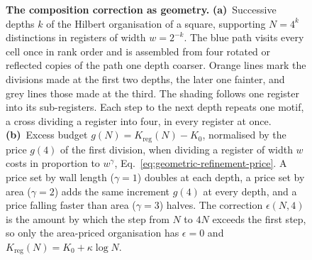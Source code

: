 \begin{figure}[t]
  \caption{\textbf{The composition correction as geometry.}
    \textbf{(a)}~Successive depths $k$ of the Hilbert organisation of a
    square, supporting $N=4^k$ distinctions in registers of width
    $w=2^{-k}$. The blue path visits every cell once in rank order and is
    assembled from four rotated or reflected copies of the path one depth
    coarser. Orange lines mark the divisions made at the first two depths,
    the later one fainter, and grey lines those made at the third. The
    shading follows one register into its sub-registers. Each step to the
    next depth repeats one motif, a cross dividing a register into four,
    in every register at once.
    \textbf{(b)}~Excess budget $g(N)=K_{\mathrm{reg}}(N)-K_0$, normalised
    by the price $g(4)$ of the first division, when dividing a register
    of width $w$ costs in proportion to $w^{\gamma}$,
    Eq.~\eqref{eq:geometric-refinement-price}. A price set by wall length
    ($\gamma=1$) doubles at each depth, a price set by area
    ($\gamma=2$) adds the same increment $g(4)$ at every depth, and a
    price falling faster than area ($\gamma=3$) halves. The correction
    $\epsilon(N,4)$ is the amount by which the step from $N$ to $4N$
    exceeds the first step, so only the area-priced organisation has
    $\epsilon=0$ and $K_{\mathrm{reg}}(N)=K_0+\kappa\log N$.}
  \label{fig:refinement-cost-laws}
\end{figure}

